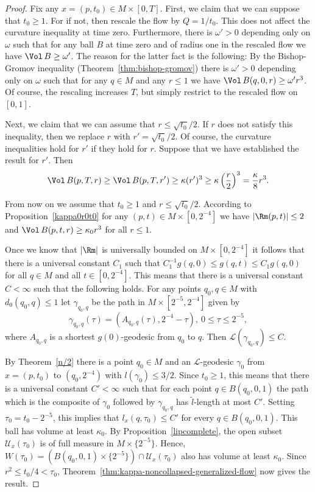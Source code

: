 \begin{proof}
Fix any $x=(p,t_0)\in M\times [0,T]$. First, we claim that we can
suppose that $t_0\ge 1$. For if not, then rescale the flow by
$Q=1/t_0$. This does not affect the curvature inequality at time
zero. Furthermore, there is $\omega'>0$ depending only on $\omega$
such that for any ball $B$ at time zero and of radius one in the
rescaled flow we have $\Vol\,B\ge \omega'$. The reason for the
latter fact is the following: By the Bishop-Gromov inequality
(Theorem~\ref{thm:bishop-gromov}) there is $\omega'>0$ depending only on
$\omega$ such that for any $q\in M$ and any $r\le 1$ we have $
\Vol\,B(q,0,r)\ge \omega'r^3$. Of course, the rescaling increases
$T$, but simply restrict to the rescaled flow on $[0,1]$.

Next, we claim that we can assume that $r\le \sqrt{t_0}/2$. If $r$
does not satisfy this inequality, then we replace $r$ with
$r'=\sqrt{t_0}/2$. Of course, the curvature inequalities hold for
$r'$ if they hold for $r$. Suppose that we have established the
result for $r'$. Then
$$\Vol\,B(p,T,r)\ge \Vol\,B(p,T,r')\ge \kappa(r')^3\ge
\kappa\left(\frac{r}{2}\right)^3=\frac{\kappa}{8}r^3.$$

From now on we assume that $t_0\ge 1$ and $r\le\sqrt{t_0}/2$.
According to Proposition~\ref{kappa0r0t0} for any $(p,t)\in M\times
[0,2^{-4}]$ we have $|\Rm(p,t)|\le 2$ and $
\Vol\,B(p,t,r)\ge \kappa_0 r^3$ for all $r\le 1$.


Once we know that $|\Rm|$ is universally bounded on $M\times
[0,2^{-4}]$ it follows that there is a universal constant $C_1$ such
that $C_1^{-1}g(q,0)\le g(q,t) \le C_1g(q,0)$ for all $q\in M$ and
all $t\in [0,2^{-4}]$. This means that there is a universal constant
$C<\infty $ such that the following holds. For any points $q_0,q\in
M$ with $d_0(q_0,q)\le 1$ let $\gamma_{q_0,q}$ be the path in
$M\times [2^{-5},2^{-4}]$ given by
$$\gamma_{q_0,q}(\tau)=(A_{q_0,q}(\tau),2^{-4}-\tau),\ 0\le \tau\le 2^{-5},$$
where $A_{q_0,q}$ is a shortest $g(0)$-geodesic from $q_0$ to $q$.
Then ${\mathcal L}(\gamma_{q_0,q})\le C$.


By Theorem~\ref{n/2} there is a point $q_0\in M$ and an ${\mathcal
L}$-geodesic $\gamma_0$ from $x=(p,t_0)$ to $(q_0,2^{-4})$ with
$l(\gamma_0)\le 3/2$. Since $t_0\ge 1$, this means that there is a
universal constant $C'<\infty$ such that for each point $q\in
B(q_0,0,1)$ the path which is the composite of $\gamma_0$ followed
by $\gamma_{q_0,q}$ has $\tilde l$-length at most $C'$. Setting
$\tau_0=t_0-2^{-5}$, this implies that $l_x(q,\tau_0)\le C'$ for
every $q\in B(q_0,0,1)$. This ball has volume at least $\kappa_0$.
By Proposition~\ref{lipcomplete}, the open subset ${\mathcal
U}_x(\tau_0)$ is of full measure in $M\times\{2^{-5}\}$. Hence,
$W(\tau_0)=\left(B(q_0,0,1)\times \{2^{-5}\}\right)\cap {\mathcal
U}_x(\tau_0)$ also has volume at least $\kappa_0$. Since $r^2\le
t_0/4<\tau_0$, Theorem~\ref{thm:kappa-noncollapsed-generalized-flow} now gives the result.
\end{proof}
